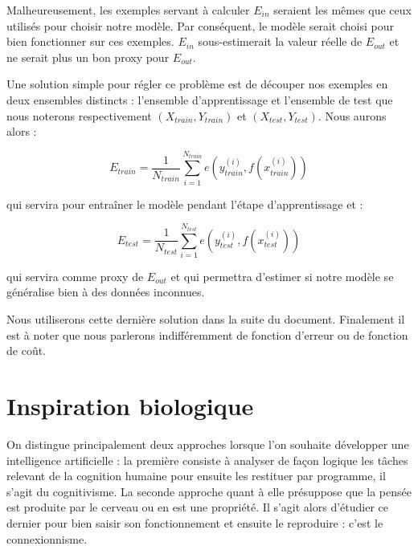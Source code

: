 Malheureusement, les exemples servant à calculer $E_{in}$ seraient les mêmes que ceux utilisés pour choisir notre modèle. Par conséquent, le modèle serait choisi pour bien fonctionner sur ces exemples. $E_{in}$ sous-estimerait la valeur réelle de $E_{out}$ et ne serait plus un bon proxy pour $E_{out}$.

Une solution simple pour régler ce problème est de découper nos exemples en deux ensembles distincts : l'ensemble d'apprentissage et l'ensemble de test que nous noterons respectivement $(X_{train}, Y_{train})$ et $(X_{test}, Y_{test})$. Nous aurons alors :

\begin{equation}
E_{train} = \frac{1}{N_{train}}\sum_{i=1}^{N_{train}}{e(y^{(i)}_{train}, f(x^{(i)}_{train}))}
\end{equation}

qui servira pour entraîner le modèle pendant l'étape d'apprentissage et :

\begin{equation}
E_{test} = \frac{1}{N_{test}}\sum_{i=1}^{N_{test}}{e(y^{(i)}_{test}, f(x^{(i)}_{test}))}
\end{equation}

qui servira comme proxy de $E_{out}$ et qui permettra d'estimer si notre modèle se généralise bien à des données inconnues.

Nous utiliserons cette dernière solution dans la suite du document. Finalement il est à noter que nous parlerons indifféremment de fonction d'erreur ou de fonction de coût.

\section{Inspiration biologique}

On distingue principalement deux approches lorsque l’on souhaite développer une intelligence artificielle : la première consiste à analyser de façon logique les tâches relevant de la cognition humaine pour ensuite les restituer par programme, il s’agit du cognitivisme. La seconde approche quant à elle présuppose que la pensée est produite par le cerveau ou en est une propriété. Il s'agit alors d’étudier ce dernier pour bien saisir son fonctionnement et ensuite le reproduire : c’est le connexionnisme.

